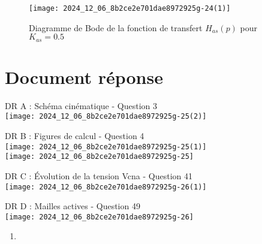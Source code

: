 \begin{figure}[!htb]
\begin{center}
\texttt{[image: 2024\_12\_06\_8b2ce2e701dae8972925g-24(1)]}
\caption{Diagramme de Bode de la fonction de transfert \(H_{a s}(p)\) pour \(K_{a s}=0.5\) \label{fig20}}
\end{center}
\end{figure}

\section{Document réponse}
DR A : Schéma cinématique - Question 3\\
\texttt{[image: 2024\_12\_06\_8b2ce2e701dae8972925g-25(2)]}

DR B : Figures de calcul - Question 4\\
\texttt{[image: 2024\_12\_06\_8b2ce2e701dae8972925g-25(1)]}\\
\texttt{[image: 2024\_12\_06\_8b2ce2e701dae8972925g-25]}

DR C : Évolution de la tension Vcna - Question 41\\
\texttt{[image: 2024\_12\_06\_8b2ce2e701dae8972925g-26(1)]}

DR D : Mailles actives - Question 49\\
\texttt{[image: 2024\_12\_06\_8b2ce2e701dae8972925g-26]}

\begin{enumerate}
  \item 
\end{enumerate}
%

